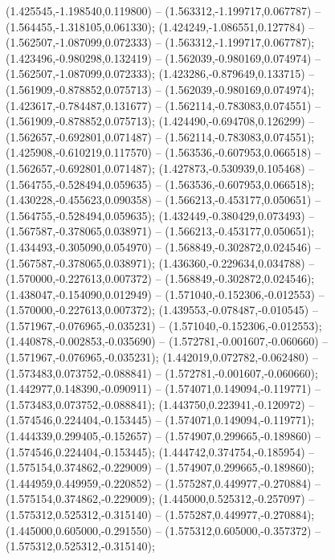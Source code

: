  (1.425545,-1.198540,0.119800) -- (1.563312,-1.199717,0.067787) -- (1.564455,-1.318105,0.061330);
 (1.424249,-1.086551,0.127784) -- (1.562507,-1.087099,0.072333) -- (1.563312,-1.199717,0.067787);
 (1.423496,-0.980298,0.132419) -- (1.562039,-0.980169,0.074974) -- (1.562507,-1.087099,0.072333);
 (1.423286,-0.879649,0.133715) -- (1.561909,-0.878852,0.075713) -- (1.562039,-0.980169,0.074974);
 (1.423617,-0.784487,0.131677) -- (1.562114,-0.783083,0.074551) -- (1.561909,-0.878852,0.075713);
 (1.424490,-0.694708,0.126299) -- (1.562657,-0.692801,0.071487) -- (1.562114,-0.783083,0.074551);
 (1.425908,-0.610219,0.117570) -- (1.563536,-0.607953,0.066518) -- (1.562657,-0.692801,0.071487);
 (1.427873,-0.530939,0.105468) -- (1.564755,-0.528494,0.059635) -- (1.563536,-0.607953,0.066518);
 (1.430228,-0.455623,0.090358) -- (1.566213,-0.453177,0.050651) -- (1.564755,-0.528494,0.059635);
 (1.432449,-0.380429,0.073493) -- (1.567587,-0.378065,0.038971) -- (1.566213,-0.453177,0.050651);
 (1.434493,-0.305090,0.054970) -- (1.568849,-0.302872,0.024546) -- (1.567587,-0.378065,0.038971);
 (1.436360,-0.229634,0.034788) -- (1.570000,-0.227613,0.007372) -- (1.568849,-0.302872,0.024546);
 (1.438047,-0.154090,0.012949) -- (1.571040,-0.152306,-0.012553) -- (1.570000,-0.227613,0.007372);
 (1.439553,-0.078487,-0.010545) -- (1.571967,-0.076965,-0.035231) -- (1.571040,-0.152306,-0.012553);
 (1.440878,-0.002853,-0.035690) -- (1.572781,-0.001607,-0.060660) -- (1.571967,-0.076965,-0.035231);
 (1.442019,0.072782,-0.062480) -- (1.573483,0.073752,-0.088841) -- (1.572781,-0.001607,-0.060660);
 (1.442977,0.148390,-0.090911) -- (1.574071,0.149094,-0.119771) -- (1.573483,0.073752,-0.088841);
 (1.443750,0.223941,-0.120972) -- (1.574546,0.224404,-0.153445) -- (1.574071,0.149094,-0.119771);
 (1.444339,0.299405,-0.152657) -- (1.574907,0.299665,-0.189860) -- (1.574546,0.224404,-0.153445);
 (1.444742,0.374754,-0.185954) -- (1.575154,0.374862,-0.229009) -- (1.574907,0.299665,-0.189860);
 (1.444959,0.449959,-0.220852) -- (1.575287,0.449977,-0.270884) -- (1.575154,0.374862,-0.229009);
 (1.445000,0.525312,-0.257097) -- (1.575312,0.525312,-0.315140) -- (1.575287,0.449977,-0.270884);
 (1.445000,0.605000,-0.291550) -- (1.575312,0.605000,-0.357372) -- (1.575312,0.525312,-0.315140);
